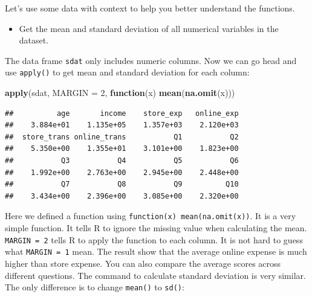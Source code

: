 \documentclass[12pt,]{krantz}
\makeatletter
\newenvironment{Shaded}{\begin{snugshade}}{\end{snugshade}}
\newcommand{\CommentTok}[1]{\textcolor[rgb]{0.37,0.37,0.37}{\textit{#1}}}
\newcommand{\ControlFlowTok}[1]{\textcolor[rgb]{0.27,0.27,0.27}{\textbf{#1}}}
\newcommand{\DataTypeTok}[1]{\textcolor[rgb]{0.27,0.27,0.27}{#1}}
\newcommand{\DecValTok}[1]{\textcolor[rgb]{0.06,0.06,0.06}{#1}}
\newcommand{\KeywordTok}[1]{\textcolor[rgb]{0.27,0.27,0.27}{\textbf{#1}}}
\newcommand{\NormalTok}[1]{#1}
\newcommand{\OperatorTok}[1]{\textcolor[rgb]{0.43,0.43,0.43}{\textbf{#1}}}
\newcommand{\StringTok}[1]{\textcolor[rgb]{0.5,0.5,0.5}{#1}}
\providecommand{\tightlist}{%
  \setlength{\itemsep}{0pt}\setlength{\parskip}{0pt}}
\newenvironment{kframe}{%
\medskip{}
\setlength{\fboxsep}{.8em}
 \def\at@end@of@kframe{}%
 \ifinner\ifhmode%
  \def\at@end@of@kframe{\end{minipage}}%
  \begin{minipage}{\columnwidth}%
 \fi\fi%
 \def\FrameCommand##1{\hskip\@totalleftmargin \hskip-\fboxsep
 \colorbox{shadecolor}{##1}\hskip-\fboxsep
     \hskip-\linewidth \hskip-\@totalleftmargin \hskip\columnwidth}%
 \MakeFramed {\advance\hsize-\width
   \@totalleftmargin\z@ \linewidth\hsize
   \@setminipage}}%
 {\par\unskip\endMakeFramed%
 \at@end@of@kframe}
\renewenvironment{Shaded}{\begin{kframe}}{\end{kframe}}
\makeatother
\begin{document}
Let's use some data with context to help you better understand the functions.

\begin{itemize}
\tightlist
\item
  Get the mean and standard deviation of all numerical variables in the dataset.
\end{itemize}

\begin{Shaded}
\end{Shaded}

The data frame \texttt{sdat} only includes numeric columns. Now we can go head and use \texttt{apply()} to get mean and standard deviation for each column:

\begin{Shaded}
\begin{Highlighting}[]
\KeywordTok{apply}\NormalTok{(sdat, }\DataTypeTok{MARGIN =} \DecValTok{2}\NormalTok{, }\ControlFlowTok{function}\NormalTok{(x) }\KeywordTok{mean}\NormalTok{(}\KeywordTok{na.omit}\NormalTok{(x)))}
\end{Highlighting}
\end{Shaded}

\begin{verbatim}
##          age       income    store_exp   online_exp 
##    3.884e+01    1.135e+05    1.357e+03    2.120e+03 
##  store_trans online_trans           Q1           Q2 
##    5.350e+00    1.355e+01    3.101e+00    1.823e+00 
##           Q3           Q4           Q5           Q6 
##    1.992e+00    2.763e+00    2.945e+00    2.448e+00 
##           Q7           Q8           Q9          Q10 
##    3.434e+00    2.396e+00    3.085e+00    2.320e+00
\end{verbatim}

Here we defined a function using \texttt{function(x)\ mean(na.omit(x))}. It is a very simple function. It tells R to ignore the missing value when calculating the mean. \texttt{MARGIN\ =\ 2} tells R to apply the function to each column. It is not hard to guess what \texttt{MARGIN\ =\ 1} mean. The result show that the average online expense is much higher than store expense. You can also compare the average scores across different questions. The command to calculate standard deviation is very similar. The only difference is to change \texttt{mean()} to \texttt{sd()}:
\end{document}
